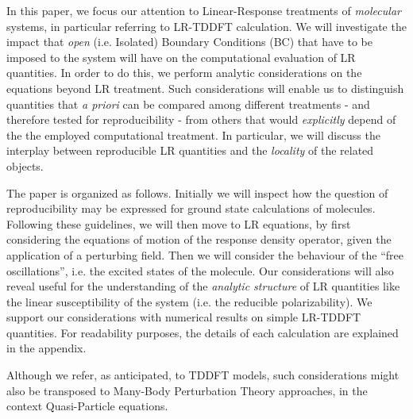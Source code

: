 \documentclass[reprint,aps,prb]{revtex4-1}
\begin{document}
In this paper, we focus our attention to Linear-Response treatments of \emph{molecular} systems, 
in particular referring to LR-TDDFT calculation. We will investigate the impact that 
\emph{open} (i.e. Isolated) Boundary Conditions (BC) that have to be imposed to the system will have on the computational evaluation of LR quantities.
In order to do this, we perform analytic considerations on the equations beyond LR treatment.
Such considerations will enable us to distinguish quantities that \textit{a priori} can be compared among different treatments - and therefore tested for reproducibility - 
from others that would \emph{explicitly} depend of the the employed computational treatment. 
In particular, we will discuss the interplay between reproducible LR quantities and the \emph{locality} of the related objects.

The paper is organized as follows.
Initially we will inspect how the question of reproducibility may be expressed 
for ground state calculations of molecules. 
Following these guidelines, we will then move to LR equations,
by first considering the equations of motion of the response density operator, given
the application of a perturbing field.
Then we will consider the behaviour of the ``free oscillations'', i.e. the excited states
of the molecule.
Our considerations will also reveal useful for the understanding of the \emph{analytic structure} of LR quantities like
the linear susceptibility of the system (i.e. the reducible polarizability).
We support our considerations with numerical results on simple LR-TDDFT quantities.
For readability purposes, the details of each calculation are explained in the appendix.

Although we refer, as anticipated, to TDDFT models, such considerations might also be transposed to Many-Body Perturbation Theory
approaches, in the context Quasi-Particle equations.

\end{document}

